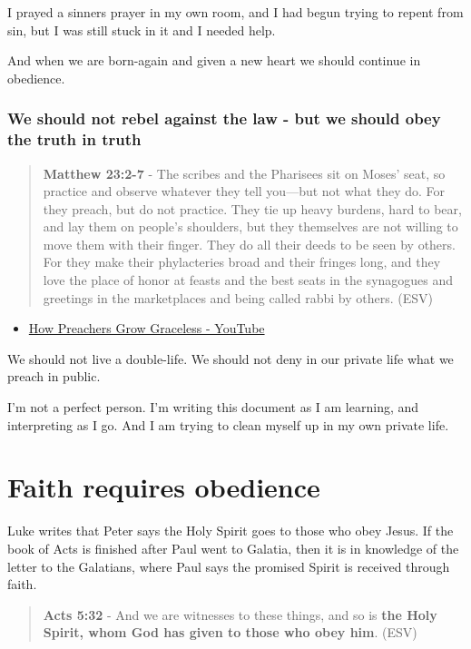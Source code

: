 \documentclass[11pt]{article}
\begin{document}
I prayed a sinners prayer in my own room, and I had begun trying to repent from sin, but I was still stuck in it and I needed help.

And when we are born-again and given a new heart we should continue in obedience.

\subsubsection{We should not rebel against the law - but we should obey the truth in truth}
\label{sec:orga0c9b06}
\begin{quote}
\textbf{Matthew 23:2-7} - The scribes and the Pharisees sit on Moses' seat, so practice and observe whatever they tell you—but not what they do. For they preach, but do not practice. They tie up heavy burdens, hard to bear, and lay them on people's shoulders, but they themselves are not willing to move them with their finger. They do all their deeds to be seen by others. For they make their phylacteries broad and their fringes long, and they love the place of honor at feasts and the best seats in the synagogues and greetings in the marketplaces and being called rabbi by others. (ESV)
\end{quote}

\begin{itemize}
\item \href{https://www.youtube.com/watch?v=alOI2zxIPgc}{How Preachers Grow Graceless - YouTube}
\end{itemize}

We should not live a double-life.
We should not deny in our private life what we preach in public.

I'm not a perfect person. I'm writing this document as I am learning, and interpreting as I go.
And I am trying to clean myself up in my own private life.

\section{Faith requires obedience}
\label{sec:orgfa0b34a}
Luke writes that Peter says the Holy Spirit goes to those who obey Jesus.
If the book of Acts is finished after Paul went to Galatia, then it is in knowledge of the letter to the Galatians, where Paul says the promised Spirit is received through faith.

\begin{quote}
\textbf{Acts 5:32} - And we are witnesses to these things, and so is \textbf{the Holy Spirit, whom God has given to those who obey him}. (ESV)
\end{quote}
\end{document}
